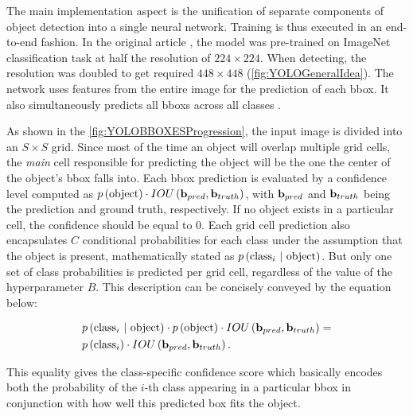 The main implementation aspect is the unification of separate components of object detection into a single neural network. Training is thus executed in an end-to-end fashion. In the original article \cite{Redmon2016}, the model was pre-trained on ImageNet \cite{imagenet_cvpr09} classification task at half the resolution of $224 \times 224$. When detecting, the resolution was doubled to get required $448 \times 448$ (\cref{fig:YOLOGeneralIdea}). The network uses features from the entire image for the prediction of each \gls{bbox}. It also simultaneously predicts all \glspl{bbox} across all classes \cite{Redmon2016}.

As shown in the \cref{fig:YOLOBBOXESProgression}, the input image is divided into an $S \times S$ grid. Since most of the time an object will overlap multiple grid cells, the \emph{main} cell responsible for predicting the object will be the one the center of the object's \gls{bbox} falls into. Each \gls{bbox} prediction is evaluated by a confidence level computed as $p \left( \text{object} \right) \cdot {IOU} \left( \mathbf{b}_{pred}, \mathbf{b}_{truth} \right)$, with $\mathbf{b}_{pred}$ and $\mathbf{b}_{truth}$ being the prediction and ground truth, respectively. If no object exists in a particular cell, the confidence should be equal to $0$. Each grid cell prediction also encapsulates $C$ conditional probabilities for each class under the assumption that the object is present, mathematically stated as $p \left( {\text{class}}_i \ | \ \text{object} \right)$. But only one set of class probabilities is predicted per grid cell, regardless of the value of the hyperparameter $B$. This description can be concisely conveyed by the equation below:

\begin{equation}
    \begin{aligned}
        \label{eq:YOLOCOnfidenceScores}
        &p \left( {\text{class}}_i \ | \ \text{object} \right)
        \cdot
        p \left( \text{object} \right)
        \cdot
        {IOU} \left( \mathbf{b}_{pred}, \mathbf{b}_{truth} \right)
        =\\
        &p \left( {\text{class}}_i \right)
        \cdot
        {IOU} \left( \mathbf{b}_{pred}, \mathbf{b}_{truth} \right).
    \end{aligned}
\end{equation}

\noindent This equality gives the class-specific confidence score which basically encodes both the probability of the $i$-th class appearing in a particular \gls{bbox} in conjunction with how well this predicted box fits the object.

